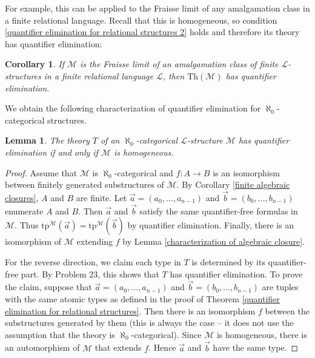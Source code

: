 \documentclass[10pt]{amsart}
\renewcommand{\L}{\mathcal{L}}
\newcommand{\M}{\mathcal{M}}
\newcommand{\MM}{\mathcal{M}}
\newcommand{\Th}{\mathrm{Th}}
\newcommand{\tp}{\mathrm{tp}}
\newtheorem{lemma}[theorem]{Lemma}
\newtheorem{corollary}[theorem]{Corollary}
\theoremstyle{definition}
\theoremstyle{remark}
\begin{document}
For example, this can be applied to the Fraisse limit of any amalgamation class in a finite relational language. Recall that this is homogeneous, so condition \ref{quantifier elimination for relational structures 2} holds and therefore its theory has quantifier elimination: 

\begin{corollary} 
If $\MM$ is the Fraisse limit of an amalgamation class of finite $\L$-structures in a finite relational language $\L$, then $\Th(\MM)$ has quantifier elimination. 
\end{corollary} 

We obtain the following characterization of quantifier elimination for $\aleph_0$-categorical structures. 

\begin{lemma} \label{characterization of quantifier elimination for aleph0-categorical structures} 
The theory $T$ of an $\aleph_0$-categorical $\L$-structure $\MM$ has quantifier elimination if and only if $\MM$ is homogeneous. 
\end{lemma} 
\begin{proof} 
Assume that $\MM$ is $\aleph_0$-categorical and $f\colon A\rightarrow B$ is an isomorphism between finitely generated substructures of $\MM$. By Corollary \ref{finite algebraic closures}, $A$ and $B$ are finite. Let $\vec{a}=(a_0,\dots,a_{n-1})$ and $\vec{b}=(b_0,\dots,b_{n-1})$ enumerate $A$ and $B$. Then $\vec{a}$ and $\vec{b}$ satisfy the same quantifier-free formulas in $\MM$. Thus $\tp^\MM(\vec{a})=\tp^\M(\vec{b})$ by quantifier elimination. Finally, there is an isomorphism of $\MM$ extending $f$ by Lemma \ref{characterization of algebraic closure}. 

For the reverse direction, we claim each type in $T$ is determined by its quantifier-free part. By Problem 23, this shows that $T$ has quantifier elimination. To prove the claim, suppose that $\vec{a}=(a_0,\dots,a_{n-1})$ and $\vec{b}=(b_0,\dots,b_{n-1})$ are tuples with the same atomic types as defined in the proof of Theorem \ref{quantifier elimination for relational structures}. Then there is an isomorphism $f$ between the substructures generated by them (this is always the case -- it does not use the assumption that the theory is $\aleph_0$-categorical). Since $\MM$ is homogeneous, there is an automorphism of $\MM$ that extends $f$. Hence $\vec{a}$ and $\vec{b}$ have the same type. 
\end{proof} 
\end{document}
